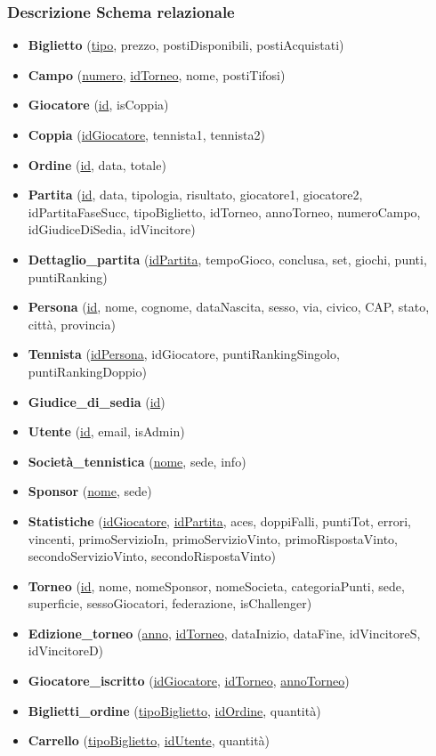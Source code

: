 \documentclass[10pt]{article}
\begin{document}
\subsubsection{Descrizione Schema relazionale}
\begin{itemize}
    \item \textbf{Biglietto} (\underline{tipo}, prezzo, postiDisponibili, postiAcquistati)
    \item \textbf{Campo} (\underline{numero}, \underline{idTorneo}, nome, postiTifosi)
    \item \textbf{Giocatore} (\underline{id}, isCoppia)
    \item \textbf{Coppia} (\underline{idGiocatore}, tennista1, tennista2)
    \item \textbf{Ordine} (\underline{id}, data, totale)
    \item \textbf{Partita} (\underline{id}, data, tipologia, risultato, giocatore1, giocatore2, idPartitaFaseSucc, tipoBiglietto, idTorneo, annoTorneo, numeroCampo, idGiudiceDiSedia, idVincitore)
    \item \textbf{Dettaglio\_partita} (\underline{idPartita}, tempoGioco, conclusa, set, giochi, punti, puntiRanking)
    \item \textbf{Persona} (\underline{id}, nome, cognome, dataNascita, sesso, via, civico, CAP, stato, città, provincia)
    \item \textbf{Tennista} (\underline{idPersona}, idGiocatore, puntiRankingSingolo, puntiRankingDoppio)
    \item \textbf{Giudice\_di\_sedia} (\underline{id})
    \item \textbf{Utente} (\underline{id}, email, isAdmin)
    \item \textbf{Società\_tennistica} (\underline{nome}, sede, info)
    \item \textbf{Sponsor} (\underline{nome}, sede)
    \item \textbf{Statistiche} (\underline{idGiocatore}, \underline{idPartita}, aces, doppiFalli, puntiTot, errori, vincenti, primoServizioIn, primoServizioVinto, primoRispostaVinto, secondoServizioVinto, secondoRispostaVinto)
    \item \textbf{Torneo} (\underline{id}, nome, nomeSponsor, nomeSocieta, categoriaPunti, sede, superficie, sessoGiocatori, federazione, isChallenger)
    \item \textbf{Edizione\_torneo} (\underline{anno}, \underline{idTorneo}, dataInizio, dataFine, idVincitoreS, idVincitoreD)
    \item \textbf{Giocatore\_iscritto} (\underline{idGiocatore}, \underline{idTorneo}, \underline{annoTorneo})
    \item \textbf{Biglietti\_ordine} (\underline{tipoBiglietto}, \underline{idOrdine}, quantità)
    \item \textbf{Carrello} (\underline{tipoBiglietto}, \underline{idUtente}, quantità)
\end{itemize}
\end{document}

